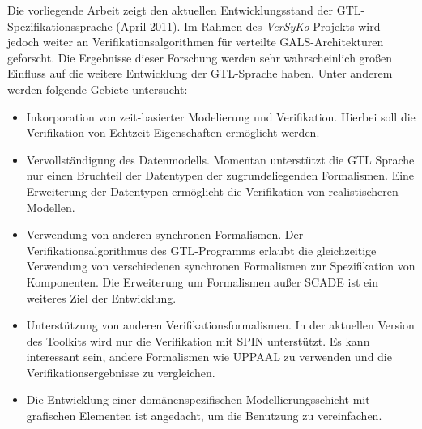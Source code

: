 Die vorliegende Arbeit zeigt den aktuellen Entwicklungsstand der GTL-Spezifikationssprache (April 2011).
Im Rahmen des \emph{VerSyKo}-Projekts wird jedoch weiter an Verifikationsalgorithmen für verteilte GALS-Architekturen geforscht.
Die Ergebnisse dieser Forschung werden sehr wahrscheinlich großen Einfluss auf die weitere Entwicklung der GTL-Sprache haben.
Unter anderem werden folgende Gebiete untersucht:
\begin{itemize}
\item Inkorporation von zeit-basierter Modelierung und Verifikation.
  Hierbei soll die Verifikation von Echtzeit-Eigenschaften ermöglicht werden.
\item Vervollständigung des Datenmodells.
  Momentan unterstützt die GTL Sprache nur einen Bruchteil der Datentypen der zugrundeliegenden Formalismen.
  Eine Erweiterung der Datentypen ermöglicht die Verifikation von realistischeren Modellen.
\item Verwendung von anderen synchronen Formalismen.
  Der Verifikationsalgorithmus des GTL-Programms erlaubt die gleichzeitige Verwendung von verschiedenen synchronen Formalismen zur Spezifikation von Komponenten.
  Die Erweiterung um Formalismen außer SCADE ist ein weiteres Ziel der Entwicklung.
\item Unterstützung von anderen Verifikationsformalismen.
  In der aktuellen Version des Toolkits wird nur die Verifikation mit SPIN unterstützt.
  Es kann interessant sein, andere Formalismen wie UPPAAL zu verwenden und die Verifikationsergebnisse zu vergleichen.
\item Die Entwicklung einer domänenspezifischen Modellierungsschicht mit grafischen Elementen ist angedacht, um die Benutzung zu vereinfachen.
\end{itemize}
